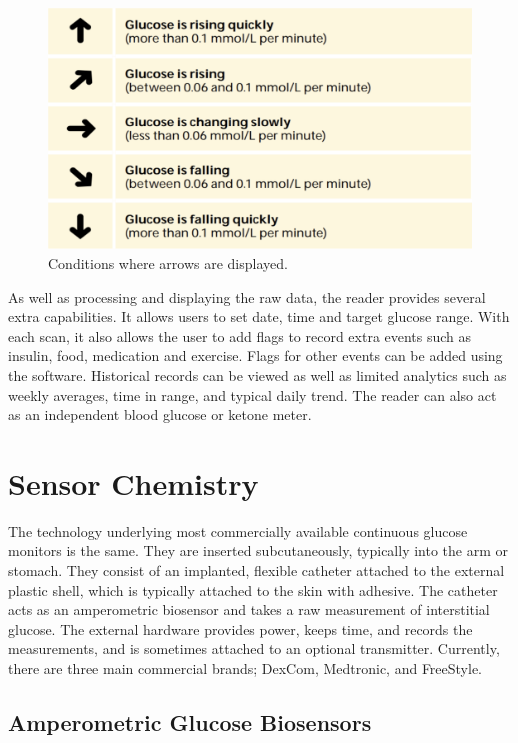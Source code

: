 \begin{figure}[ht]
\centering\includegraphics[width=1.0\linewidth]{images/arrows.png}
\caption{Conditions where arrows are displayed.}
\label{fig:arrows}
\end{figure}

As well as processing and displaying the raw data, the reader provides several extra capabilities. It allows users to set date, time and target glucose range. With each scan, it also allows the user to add flags to record extra events such as insulin, food, medication and exercise. Flags for other events can be added using the software. Historical records can be viewed as well as limited analytics such as weekly averages, time in range, and typical daily trend. The reader can also act as an independent blood glucose or ketone meter.  

\section{Sensor Chemistry}

The technology underlying most commercially available continuous glucose monitors is the same. They are inserted subcutaneously, typically into the arm or stomach. They consist of an implanted, flexible catheter attached to the external plastic shell, which is typically attached to the skin with adhesive. The catheter acts as an amperometric biosensor and takes a raw measurement of interstitial glucose. The external hardware provides power, keeps time, and records the measurements, and is sometimes attached to an optional transmitter. Currently, there are three main commercial brands; DexCom, Medtronic, and FreeStyle.

\subsection{Amperometric Glucose Biosensors}

